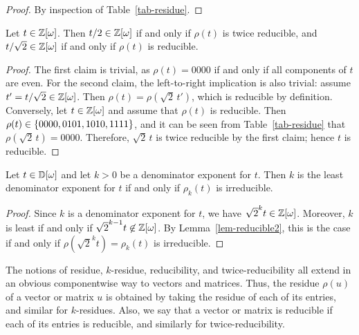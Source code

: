 \begin{proof}
  By inspection of Table~\ref{tab-residue}.
\end{proof}

\begin{lemma}\label{lem-reducible2}
  Let $t\in\mathbb{Z}[\omega]$. Then $t/2\in\mathbb{Z}[\omega]$ if and only if $\rho(t)$ is twice reducible, and
  $t/\sqrt{2}\in\mathbb{Z}[\omega]$ if and only if $\rho(t)$ is reducible.
\end{lemma}

\begin{proof}
  The first claim is trivial, as $\rho(t)=0000$ if and only if all components of $t$ are even. For
  the second claim, the left-to-right implication is also trivial: assume $t'=t/\sqrt{2}\in\mathbb{Z}[\omega]$.
  Then $\rho(t) = \rho(\sqrt{2}\,t')$, which is reducible by definition. Conversely, let $t\in\mathbb{Z}[\omega]$
  and assume that $\rho(t)$ is reducible. Then $\rho(t)\in\{0000, 0101, 1010, 1111\}$, and it can
  be seen from Table~\ref{tab-residue} that $\rho(\sqrt{2}\,t)=0000$. Therefore, $\sqrt{2}\,t$ is
  twice reducible by the first claim; hence $t$ is reducible.
\end{proof}

\begin{corollary}\label{cor-reducible3}
  Let $t\in\mathbb{D}[\omega]$ and let $k>0$ be a denominator exponent for $t$. Then $k$ is the least denominator
  exponent for $t$ if and only if $\rho_k(t)$ is irreducible.
\end{corollary}

\begin{proof}
  Since $k$ is a denominator exponent for $t$, we have $\sqrt{2}^k t \in \mathbb{Z}[\omega]$. Moreover, $k$ is
  least if and only if $\sqrt{2}^{k-1} t\not\in\mathbb{Z}[\omega]$. By Lemma~\ref{lem-reducible2}, this is the
  case if and only if $\rho(\sqrt{2}^k t)=\rho_k(t)$ is irreducible.
\end{proof}

\begin{definition}
  The notions of residue, $k$-residue, reducibility, and twice-reducibility all extend in an
  obvious componentwise way to vectors and matrices. Thus, the residue $\rho(u)$ of a vector or
  matrix $u$ is obtained by taking the residue of each of its entries, and similar for
  $k$-residues. Also, we say that a vector or matrix is reducible if each of its entries is
  reducible, and similarly for twice-reducibility.
\end{definition}


